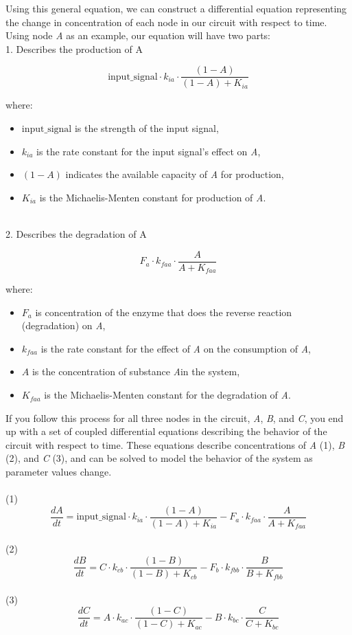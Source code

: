 \documentclass{article}
\begin{document}
Using this general equation, we can construct a differential equation representing the change in concentration of each node in our circuit with respect to time. Using node \textit{A} as an example, our equation will have two parts:
\\

1. Describes the production of A

\[
\text{input\_signal} \cdot k_{ia} \cdot \frac{(1 - A)}{(1 - A) + K_{ia}}
\]


where:
\begin{itemize}
    \item \(\text{input\_signal}\) is the strength of the input signal,
    \item \(k_{ia}\) is the rate constant for the input signal's effect on \textit{A},
    \item \((1 - A)\) indicates the available capacity of \textit{A} for production,
    \item \(K_{ia}\) is the Michaelis-Menten constant for production of \textit{A}.
\end{itemize}
\\
2. Describes the degradation of A

\[
F_a \cdot k_{faa} \cdot \frac{A}{A + K_{faa}}
\]

where:
\begin{itemize}
    \item \(F_a\) is concentration of the enzyme that does the reverse reaction (degradation) on \textit{A},
    \item \(k_{faa}\) is the rate constant for the effect of \textit{A} on the consumption of \textit{A},
    \item \(A\) is the concentration of substance \textit{A}in the system,
    \item \(K_{faa}\) is the Michaelis-Menten constant for the degradation of \textit{A}.
\end{itemize}



If you follow this process for all three nodes in the circuit, \textit{A}, \textit{B}, and \textit{C}, you end up with a set of coupled differential equations describing the behavior of the circuit with respect to time. These equations describe concentrations of \textit{A} (1), \textit{B} (2), and \textit{C} (3), and can be solved to model the behavior of the system as parameter values change. 
\\
\\
(1)
\[
\frac{dA}{dt} = \text{input\_signal} \cdot k_{ia} \cdot \frac{(1 - A)}{(1 - A) + K_{ia}} - F_a \cdot k_{faa} \cdot \frac{A}{A + K_{faa}}
\]
\\
(2)
\[
\frac{dB}{dt} = C \cdot k_{cb} \cdot \frac{(1 - B)}{(1 - B) + K_{cb}} - F_b \cdot k_{fbb} \cdot \frac{B}{B + K_{fbb}}
\]
\\
(3)
\[
\frac{dC}{dt} = A \cdot k_{ac} \cdot \frac{(1 - C)}{(1 - C) + K_{ac}} - B \cdot k_{bc} \cdot \frac{C}{C + K_{bc}}
\]
\end{document}
